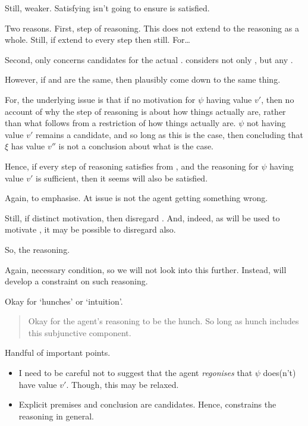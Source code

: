 \begin{note}
  Still, weaker.
  Satisfying \ideaCSB{} isn't going to ensure \ideaCSA{} is satisfied.

  Two reasons.
  First, step of reasoning.
  This does not extend to the reasoning as a whole.
  Still, if extend to every step then still.
  For\dots

  Second, only concerns candidates for the actual \world{}.
  \ideaCSA{} considers not only \epVAd{} , but any \epPAd{} \world{}.

  However, if \epVAd{} and \epPAd{}  are the same, then plausibly come down to the same thing.

    For, the underlying issue is that if no motivation for \(\psi\) having value \(v'\), then no account of why the step of reasoning is about how things actually are, rather than what follows from a restriction of how things actually are.
  \(\psi\) not having value \(v'\) remains a candidate, and so long as this is the case, then concluding that \(\xi\) has value \(v''\) is not a conclusion about what is the case.

  Hence, if every step of reasoning satisfies \ideaCSB{} from \epPAd{} \world{}, and the reasoning for \(\psi\) having value \(v'\) is sufficient, then it seems \ideaCSA{} will also be satisfied.

  Again, to emphasise.
  At issue is not the agent getting something wrong.

  Still, if distinct motivation, then disregard \ideaCSA{}.
  And, indeed, as \ideaCSB{} will be used to motivate \ideaCSC{}, it may be possible to disregard \ideaCSB{} also.
\end{note}

\begin{note}
  So, the reasoning.
\end{note}

\begin{note}
  Again, necessary condition, so we will not look into this further.
  Instead, \ideaCSC{} will develop a constraint on such reasoning.

  Okay for `hunches' or `intuition'.
    \begin{quote}
    Okay for the agent's reasoning to be the hunch.
    So long as hunch includes this subjunctive component.
  \end{quote}
\end{note}

\begin{note}
  Handful of important points.
  \begin{itemize}
  \item I need to be careful not to suggest that the agent \emph{regonises} that \(\psi\) does(n't) have value \(v'\).
    Though, this may be relaxed.
  \item Explicit premises and conclusion are candidates.
  Hence, \label{idea:CS:B:step:requ} constrains the reasoning in general.
  \end{itemize}
\end{note}


